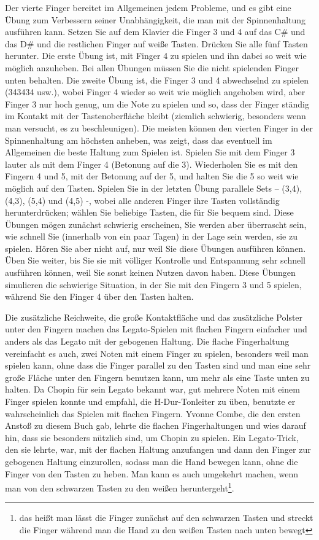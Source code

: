 Der vierte Finger bereitet im Allgemeinen jedem Probleme, und es gibt eine Übung zum Verbessern seiner Unabhängigkeit, die man mit der Spinnenhaltung ausführen kann.
Setzen Sie auf dem Klavier die Finger 3 und 4 auf das C\# und das D\# und die restlichen Finger auf weiße Tasten.
Drücken Sie alle fünf Tasten herunter.
Die erste Übung ist, mit Finger 4 zu spielen und ihn dabei so weit wie möglich anzuheben.
Bei allen Übungen müssen Sie die nicht spielenden Finger unten behalten.
Die zweite Übung ist, die Finger 3 und 4 abwechselnd zu spielen (343434 usw.), wobei Finger 4 wieder so weit wie möglich angehoben wird, aber Finger 3 nur hoch genug, um die Note zu spielen und so, dass der Finger ständig im Kontakt mit der Tastenoberfläche bleibt (ziemlich schwierig, besonders wenn man versucht, es zu beschleunigen).
Die meisten können den vierten Finger in der Spinnenhaltung am höchsten anheben, was zeigt, dass das eventuell im Allgemeinen die beste Haltung zum Spielen ist.
Spielen Sie mit dem Finger 3 lauter als mit dem Finger 4 (Betonung auf die 3).
Wiederholen Sie es mit den Fingern 4 und 5, mit der Betonung auf der 5, und halten Sie die 5 so weit wie möglich auf den Tasten.
Spielen Sie in der letzten Übung parallele Sets -- (3,4), (4,3), (5,4) und (4,5) -, wobei alle anderen Finger ihre Tasten vollständig herunterdrücken; wählen Sie beliebige Tasten, die für Sie bequem sind.
Diese Übungen mögen zunächst schwierig erscheinen, Sie werden aber überrascht sein, wie schnell Sie (innerhalb von ein paar Tagen) in der Lage sein werden, sie zu spielen.
Hören Sie aber nicht auf, nur weil Sie diese Übungen ausführen können.
Üben Sie weiter, bis Sie sie mit völliger Kontrolle und Entspannung sehr schnell ausführen können, weil Sie sonst keinen Nutzen davon haben.
Diese Übungen simulieren die schwierige Situation, in der Sie mit den Fingern 3 und 5 spielen, während Sie den Finger 4 über den Tasten halten.

Die zusätzliche Reichweite, die große Kontaktfläche und das zusätzliche Polster unter den Fingern machen das Legato-Spielen mit flachen Fingern einfacher und anders als das Legato mit der gebogenen Haltung.
Die flache Fingerhaltung vereinfacht es auch, zwei Noten mit einem Finger zu spielen, besonders weil man spielen kann, ohne dass die Finger parallel zu den Tasten sind und man eine sehr große Fläche unter den Fingern benutzen kann, um mehr als eine Taste unten zu halten.
Da Chopin für sein Legato bekannt war, gut mehrere Noten mit einem Finger spielen konnte und empfahl, die H-Dur-Tonleiter zu üben, benutzte er wahrscheinlich das Spielen mit flachen Fingern.
Yvonne Combe, die den ersten Anstoß zu diesem Buch gab, lehrte die flachen Fingerhaltungen und wies darauf hin, dass sie besonders nützlich sind, um Chopin zu spielen.
Ein Legato-Trick, den sie lehrte, war, mit der flachen Haltung anzufangen und dann den Finger zur gebogenen Haltung einzurollen, sodass man die Hand bewegen kann, ohne die Finger von den Tasten zu heben.
Man kann es auch umgekehrt machen, wenn man von den schwarzen Tasten zu den weißen heruntergeht\footnote{das heißt man lässt die Finger zunächst auf den schwarzen Tasten und streckt die Finger während man die Hand zu den weißen Tasten nach unten bewegt}.


